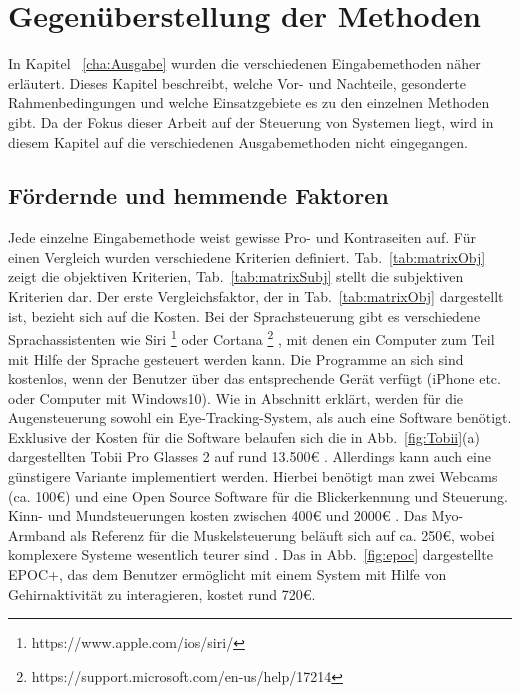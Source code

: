 \chapter{Gegenüberstellung der Methoden}
\label{cha:Vergleich}

In Kapitel ~\ref{cha:Ausgabe} wurden die verschiedenen Eingabemethoden näher erläutert. Dieses Kapitel beschreibt, welche Vor- und Nachteile, gesonderte Rahmenbedingungen und welche Einsatzgebiete es zu den einzelnen Methoden gibt. Da der Fokus dieser Arbeit auf der Steuerung von Systemen liegt, wird in diesem Kapitel auf die verschiedenen Ausgabemethoden nicht eingegangen.

\section{Fördernde und hemmende Faktoren}
%
Jede einzelne Eingabemethode weist gewisse Pro- und Kontraseiten auf. Für einen Vergleich wurden verschiedene Kriterien definiert. Tab.~\ref{tab:matrixObj} zeigt die objektiven Kriterien, Tab.~\ref{tab:matrixSubj} stellt die subjektiven Kriterien dar.
\newline \newline
Der erste Vergleichsfaktor, der in Tab.~\ref{tab:matrixObj} dargestellt ist, bezieht sich auf die Kosten. Bei der Sprachsteuerung gibt es verschiedene Sprachassistenten wie \zB Siri%
\footnote{https://www.apple.com/ios/siri/}
%
 oder Cortana%
\footnote{https://support.microsoft.com/en-us/help/17214}
%
 , mit denen ein Computer zum Teil mit Hilfe der Sprache gesteuert werden kann. Die Programme an sich sind kostenlos, wenn der Benutzer über das entsprechende Gerät verfügt (iPhone etc. oder Computer mit Windows10).
Wie in Abschnitt \label{cha:Augensteuerung} erklärt, werden für die Augensteuerung sowohl ein Eye-Tracking-System, als auch eine Software benötigt. Exklusive der Kosten für die Software belaufen sich die in Abb.~\ref{fig:Tobii}(a) dargestellten Tobii Pro Glasses 2 auf rund 13.500€ \cite{TobiiCosts}. Allerdings kann auch eine günstigere Variante implementiert werden. Hierbei benötigt man zwei Webcams (ca. 100€) und eine Open Source Software für die Blickerkennung und Steuerung. Kinn- und Mundsteuerungen kosten zwischen 400€ und 2000€ \cite{SENSORY} \cite{INTEGRA}. Das Myo-Armband als Referenz für die Muskelsteuerung beläuft sich auf ca. 250€, wobei komplexere Systeme wesentlich teurer sind \cite{myoBand}. Das in Abb.~\ref{fig:epoc} dargestellte EPOC+, das dem Benutzer ermöglicht mit einem System mit Hilfe von Gehirnaktivität zu interagieren, kostet rund 720€.
